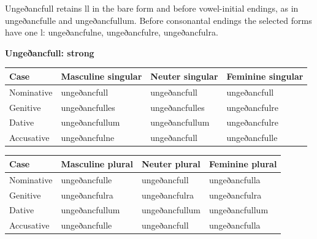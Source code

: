 Ungeðancfull retains ll in the bare form and before vowel-initial endings, as in ungeðancfulle and ungeðancfullum. Before consonantal endings the selected forms have one l: ungeðancfulne, ungeðancfulre, ungeðancfulra.

\textbf{Ungeðancfull: strong}

\par\begingroup
\fontsize{10.5}{13.2}\selectfont
\setlength{\LTleft}{0pt}\setlength{\LTright}{\fill}
\noindent
\begin{tabular}{@{}>{\raggedright\arraybackslash}p{22.0mm}>{\raggedright\arraybackslash}p{31.188mm}>{\raggedright\arraybackslash}p{31.188mm}>{\raggedright\arraybackslash}p{31.188mm}@{}}
\toprule
\textbf{Case} & \textbf{Masculine singular} & \textbf{Neuter singular} & \textbf{Feminine singular} \\
\midrule
Nominative & ungeðancfull & ungeðancfull & ungeðancfull \\
Genitive & ungeðancfulles & ungeðancfulles & ungeðancfulre \\
Dative & ungeðancfullum & ungeðancfullum & ungeðancfulre \\
Accusative & ungeðancfulne & ungeðancfull & ungeðancfulle \\
\bottomrule
\end{tabular}
\par\endgroup
\par\addvspace{5pt}
\par\begingroup
\fontsize{10.5}{13.2}\selectfont
\setlength{\LTleft}{0pt}\setlength{\LTright}{\fill}
\noindent
\begin{tabular}{@{}>{\raggedright\arraybackslash}p{22.0mm}>{\raggedright\arraybackslash}p{31.188mm}>{\raggedright\arraybackslash}p{31.188mm}>{\raggedright\arraybackslash}p{31.188mm}@{}}
\toprule
\textbf{Case} & \textbf{Masculine plural} & \textbf{Neuter plural} & \textbf{Feminine plural} \\
\midrule
Nominative & ungeðancfulle & ungeðancfull & ungeðancfulla \\
Genitive & ungeðancfulra & ungeðancfulra & ungeðancfulra \\
Dative & ungeðancfullum & ungeðancfullum & ungeðancfullum \\
Accusative & ungeðancfulle & ungeðancfull & ungeðancfulla \\
\bottomrule
\end{tabular}
\par\endgroup

